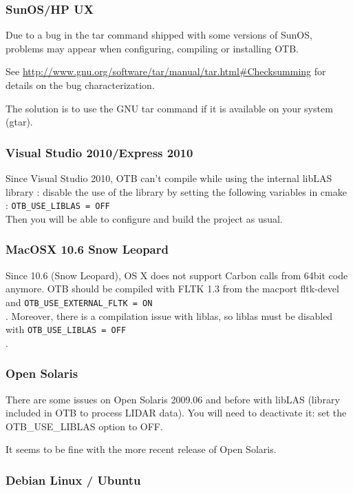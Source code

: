\subsubsection{SunOS/HP UX}
Due to a bug in the tar command shipped with some versions of SunOS,
problems may appear when configuring, compiling or installing OTB.

See \url{http://www.gnu.org/software/tar/manual/tar.html#Checksumming} for
details on the bug characterization.

The solution is to use the GNU tar command if it is available on your
system (gtar).

\subsubsection{Visual Studio 2010/Express 2010}
Since Visual Studio 2010, OTB can't compile while using the internal libLAS library : disable the use of the library by setting 
the following variables in cmake :  \texttt{OTB\_USE\_LIBLAS = OFF}\\
Then you will be able to configure and build the project as usual.

\subsubsection{MacOSX 10.6 Snow Leopard}
Since 10.6 (Snow Leopard), OS X does not support Carbon calls from 64bit code anymore. OTB should be compiled with FLTK 1.3 from the macport fltk-devel and \texttt{OTB\_USE\_EXTERNAL\_FLTK = ON}\\. Moreover, there is a compilation issue with liblas, so liblas must be disabled with \texttt{OTB\_USE\_LIBLAS = OFF}\\.

\subsubsection{Open Solaris}
There are some issues on Open Solaris 2009.06 and before with libLAS (library included
in OTB to process LIDAR data). You will need to deactivate it: set the
OTB\_USE\_LIBLAS option to OFF.

It seems to be fine with the more recent release of Open Solaris.

\subsubsection{Debian Linux / Ubuntu}

